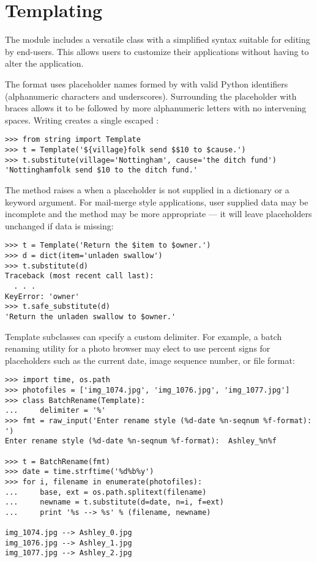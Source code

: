 \documentclass{manual}
\begin{document}
\section{Templating\label{templating}}

The  module includes a
versatile  class with a simplified syntax suitable for
editing by end-users.  This allows users to customize their applications
without having to alter the application.

The format uses placeholder names formed by \samp{\$} with valid Python
identifiers (alphanumeric characters and underscores).  Surrounding the
placeholder with braces allows it to be followed by more alphanumeric letters
with no intervening spaces.  Writing \samp{\$\$} creates a single escaped
\samp{\$}:

\begin{verbatim}
>>> from string import Template
>>> t = Template('${village}folk send $$10 to $cause.')
>>> t.substitute(village='Nottingham', cause='the ditch fund')
'Nottinghamfolk send $10 to the ditch fund.'
\end{verbatim}

The  method raises a  when a
placeholder is not supplied in a dictionary or a keyword argument. For
mail-merge style applications, user supplied data may be incomplete and the
 method may be more appropriate --- it will leave
placeholders unchanged if data is missing:

\begin{verbatim}
>>> t = Template('Return the $item to $owner.')
>>> d = dict(item='unladen swallow')
>>> t.substitute(d)
Traceback (most recent call last):
  . . .
KeyError: 'owner'
>>> t.safe_substitute(d)
'Return the unladen swallow to $owner.'
\end{verbatim}

Template subclasses can specify a custom delimiter.  For example, a batch
renaming utility for a photo browser may elect to use percent signs for
placeholders such as the current date, image sequence number, or file format:

\begin{verbatim}
>>> import time, os.path
>>> photofiles = ['img_1074.jpg', 'img_1076.jpg', 'img_1077.jpg']
>>> class BatchRename(Template):
...     delimiter = '%'
>>> fmt = raw_input('Enter rename style (%d-date %n-seqnum %f-format):  ')
Enter rename style (%d-date %n-seqnum %f-format):  Ashley_%n%f

>>> t = BatchRename(fmt)
>>> date = time.strftime('%d%b%y')
>>> for i, filename in enumerate(photofiles):
...     base, ext = os.path.splitext(filename)
...     newname = t.substitute(d=date, n=i, f=ext)
...     print '%s --> %s' % (filename, newname)

img_1074.jpg --> Ashley_0.jpg
img_1076.jpg --> Ashley_1.jpg
img_1077.jpg --> Ashley_2.jpg
\end{verbatim}
\end{document}
